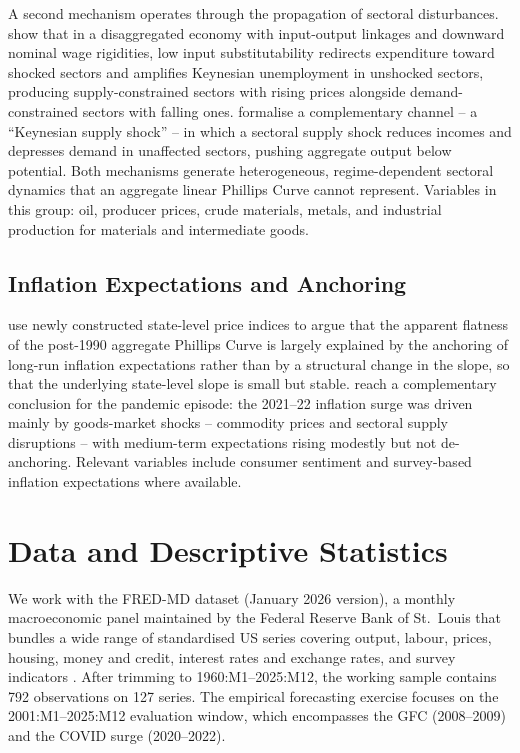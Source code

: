 \documentclass[12pt,a4paper]{article}
\begin{document}
A second mechanism operates through the propagation of sectoral disturbances. \citet{baqaee2022} show that in a disaggregated economy with input-output linkages and downward nominal wage rigidities, low input substitutability redirects expenditure toward shocked sectors and amplifies Keynesian unemployment in unshocked sectors, producing supply-constrained sectors with rising prices alongside demand-constrained sectors with falling ones. \citet{guerrieri2022} formalise a complementary channel -- a ``Keynesian supply shock'' -- in which a sectoral supply shock reduces incomes and depresses demand in unaffected sectors, pushing aggregate output below potential. Both mechanisms generate heterogeneous, regime-dependent sectoral dynamics that an aggregate linear Phillips Curve cannot represent. Variables in this group: oil, producer prices, crude materials, metals, and industrial production for materials and intermediate goods.


\subsection{Inflation Expectations and Anchoring}
\label{subsec:theory_other}

\citet{hazell2022} use newly constructed state-level price indices to argue that the apparent flatness of the post-1990 aggregate Phillips Curve is largely explained by the anchoring of long-run inflation expectations rather than by a structural change in the slope, so that the underlying state-level slope is small but stable. \citet{bernanke2023} reach a complementary conclusion for the pandemic episode: the 2021--22 inflation surge was driven mainly by goods-market shocks -- commodity prices and sectoral supply disruptions -- with medium-term expectations rising modestly but not de-anchoring. Relevant variables include consumer sentiment and survey-based inflation expectations where available.


\FloatBarrier
\section{Data and Descriptive Statistics}
\label{sec:data}

We work with the FRED-MD dataset (January 2026 version), a monthly macroeconomic panel maintained by the Federal Reserve Bank of St.\ Louis that bundles a wide range of standardised US series covering output, labour, prices, housing, money and credit, interest rates and exchange rates, and survey indicators \citep{mccracken2016fredmd}. After trimming to 1960:M1--2025:M12, the working sample contains 792 observations on 127 series. The empirical forecasting exercise focuses on the 2001:M1--2025:M12 evaluation window, which encompasses the GFC (2008--2009) and the COVID surge (2020--2022).
\end{document}
